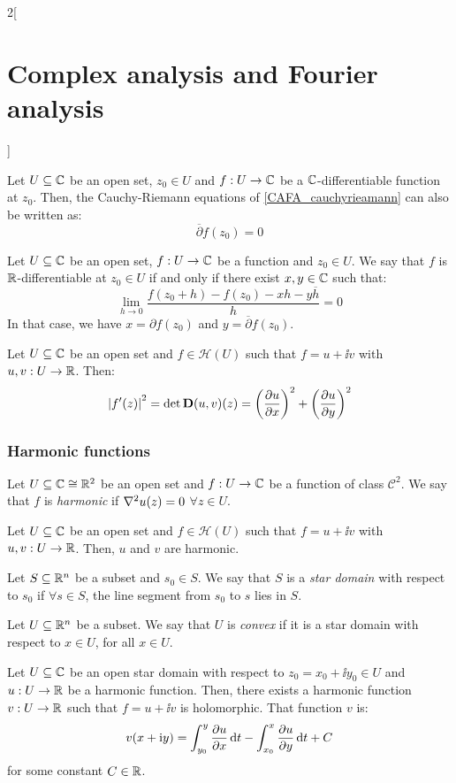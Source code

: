 \documentclass[../../../main.tex]{subfiles}
\begin{document}
\begin{multicols}{2}[\section{Complex analysis and Fourier analysis}]
\begin{proposition}
    Let $U\subseteq \mathbb{C}$ be an open set, $z_0\in U$ and $f:U\rightarrow \mathbb{C}$ be a $\mathbb{C}$-differentiable function at $z_0$. Then, the Cauchy-Riemann equations of \cref{CAFA_cauchyrieamann} can also be written as: $$\overline{\partial} f(z_0)=0$$
  \end{proposition}
  \begin{proposition}
    Let $U\subseteq \mathbb{C}$ be an open set, $f:U\rightarrow \mathbb{C}$ be a function and $z_0\in U$. We say that $f$ is $\mathbb{R}$-differentiable at $z_0\in U$ if and only if there exist $x,y\in \mathbb{C}$ such that: $$\lim_{h\to 0}\frac{f(z_0+h)-f(z_0)-xh-y\overline{h}}{h}=0$$
    In that case, we have $x=\partial f(z_0)$ and $y=\overline{\partial} f(z_0)$.
  \end{proposition}
  \begin{proposition}
    Let $U\subseteq \mathbb{C}$ be an open set and $f\in\mathcal{H}(U)$ such that $f=u+\ii v$ with $u,v:U\rightarrow\mathbb{R}$. Then:
    $${|f'(z)|}^2=\det \boldsymbol{\mathrm{D}}(u,v)(z)={\left(\pdv{u}{x}\right)}^2+{\left(\pdv{u}{y}\right)}^2$$
  \end{proposition}
  \subsubsection{Harmonic functions}
  \begin{definition}
    Let $U\subseteq \mathbb{C}\cong\mathbb{R}^2$ be an open set and $f:U\rightarrow \mathbb{C}$ be a function of class $\mathcal{C}^2$. We say that $f$ is \emph{harmonic} if $\laplacian u(z)=0$ $\forall z\in U$.
  \end{definition}
  \begin{proposition}
    Let $U\subseteq \mathbb{C}$ be an open set and $f\in\mathcal{H}(U)$ such that $f=u+\ii v$ with $u,v:U\rightarrow\mathbb{R}$. Then, $u$ and $v$ are harmonic.
  \end{proposition}
  \begin{definition}
    Let $S\subseteq\mathbb{R}^n$ be a subset and $s_0\in S$. We say that $S$ is a \emph{star domain} with respect to $s_0$ if $\forall s\in S$, the line segment from $s_0$ to $s$ lies in $S$.
  \end{definition}
  \begin{definition}
    Let $U\subseteq\mathbb{R}^n$ be a subset. We say that $U$ is \emph{convex} if it is a star domain with respect to $x\in U$, for all $x\in U$.
  \end{definition}
  \begin{proposition}
    Let $U\subseteq \mathbb{C}$ be an open star domain with respect to $z_0=x_0+\ii y_0\in U$ and $u:U\rightarrow\mathbb{R}$ be a harmonic function. Then, there exists a harmonic function $v:U\rightarrow\mathbb{R}$ such that $f=u+\ii v$ is holomorphic. That function $v$ is:
    $$v(x+\mathrm{i} y)=\int_{y_0}^y\pdv{u}{x}(x+\mathrm{i} t)\dd{t}-\int_{x_0}^x\pdv{u}{y}(t+\mathrm{i} y_0)\dd{t}+C$$
    for some constant $C\in\mathbb{R}$.
  \end{proposition}

\end{multicols}
\end{document}
